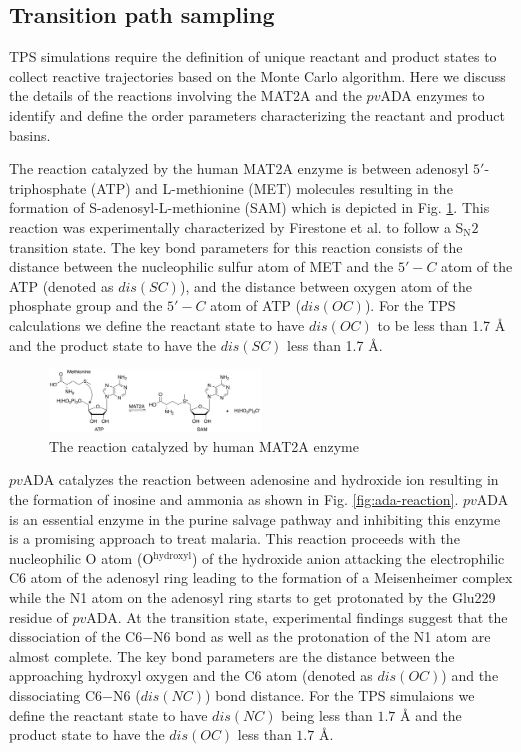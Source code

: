 \documentclass[journal=jpcbfk,manuscript=article,layout=traditional]{achemso}
\begin{document}
\subsection{Transition path sampling}
TPS simulations require the definition of unique reactant and product states
to collect reactive trajectories based on the Monte Carlo algorithm. Here we 
discuss the details of the reactions involving the MAT2A and the $pv$ADA enzymes 
to identify and define the order parameters characterizing the reactant and product basins.  

The reaction catalyzed by the human MAT2A enzyme is
between adenosyl $5'$-triphosphate (ATP) and L-methionine (MET) molecules resulting in the formation of
S-adenosyl-L-methionine (SAM) which is depicted in Fig. \ref{fig:mat2a-reaction}.
 This reaction was experimentally characterized by 
Firestone et al. \cite{Firestone17JAmChemSoc139p13754} to follow a S$_{\text{N}}2$ transition 
state. The key bond parameters for this reaction consists of the distance between the
nucleophilic sulfur atom of MET and the $5'-C$ atom of the ATP (denoted as $dis(SC)$), and the distance between 
oxygen atom of the phosphate group and the $5'-C$ atom of ATP ($dis(OC)$).
For the TPS calculations we define the reactant state to have $dis(OC)$ to be 
less than 1.7 {\AA} and the product state to have the $dis(SC)$ less than 1.7 {\AA}. 

\begin{figure}
\includegraphics[width=0.5\textwidth]{figures/mat2a-reaction.png}
\caption{The reaction catalyzed by human MAT2A enzyme}
\label{fig:mat2a-reaction}
\end{figure}

$pv$ADA catalyzes the reaction between adenosine and hydroxide ion 
resulting in the formation of inosine and ammonia as shown in
Fig. \ref{fig:ada-reaction}.
$pv$ADA is an essential enzyme in the purine salvage pathway and 
inhibiting this enzyme is a promising approach to treat malaria.   
This reaction proceeds with the nucleophilic O atom (O$^{\text{hydroxyl}}$) of the hydroxide anion
attacking the electrophilic C6 atom of the adenosyl ring leading to the formation of a Meisenheimer 
complex while the N1 atom on the adenosyl ring starts to get 
protonated by the Glu229 residue of $pv$ADA. At the transition state, experimental findings 
suggest that the dissociation of the C6$-$N6 bond as well as the protonation of the N1 
atom are almost complete. \cite{Luo07JAmChemSoc129p8008} The key bond parameters are 
the distance between the approaching hydroxyl oxygen and the C6 atom (denoted as $dis(OC)$) and the 
dissociating C6$-$N6 ($dis(NC)$) bond distance. For the TPS simulaions we define the reactant state to 
have $dis(NC)$ being less than $1.7$ {\AA} and the product state to have the 
$dis(OC)$ less than $1.7$ {\AA}.
\end{document}
